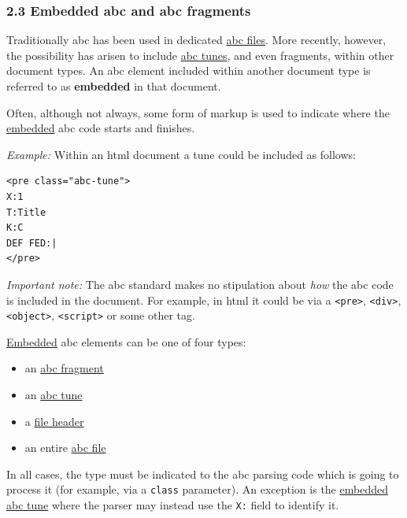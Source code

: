 \documentclass[oneside]{book}
\begin{document}
\hypertarget{embedded_abc_and_abc_fragments}{\subsubsection{2.3 Embedded
abc and abc fragments}\label{embedded_abc_and_abc_fragments}}

\href{}{}Traditionally abc has been used in dedicated
\protect\hyperlink{abc_file_definition}{abc files}. More recently,
however, the possibility has arisen to include
\protect\hyperlink{abc_tune_definition}{abc tunes}, and even fragments,
within other document types. An abc element included within another
document type is referred to as \textbf{embedded} in that document.

Often, although not always, some form of markup is used to indicate
where the \protect\hyperlink{embedded_definition}{embedded} abc code
starts and finishes.

\emph{Example:} Within an html document a tune could be included as
follows:

\begin{verbatim}
<pre class="abc-tune">
X:1
T:Title
K:C
DEF FED:|
</pre>
\end{verbatim}

\emph{Important note:} The abc standard makes no stipulation about
\emph{how} the abc code is included in the document. For example, in
html it could be via a \texttt{\textless{}pre\textgreater{}},
\texttt{\textless{}div\textgreater{}},
\texttt{\textless{}object\textgreater{}},
\texttt{\textless{}script\textgreater{}} or some other tag.

\protect\hyperlink{embedded_definition}{Embedded} abc elements can be
one of four types:

\begin{itemize}
\item
  an \protect\hyperlink{abc_fragment_definition}{abc fragment}
\item
  an \protect\hyperlink{abc_tune_definition}{abc tune}
\item
  a \protect\hyperlink{file_header_definition}{file header}
\item
  an entire \protect\hyperlink{abc_file_definition}{abc file}
\end{itemize}

In all cases, the type must be indicated to the abc parsing code which
is going to process it (for example, via a \texttt{class} parameter). An
exception is the \protect\hyperlink{embedded_definition}{embedded}
\protect\hyperlink{abc_tune_definition}{abc tune} where the parser may
instead use the \texttt{X:} field to identify it.
\end{document}
